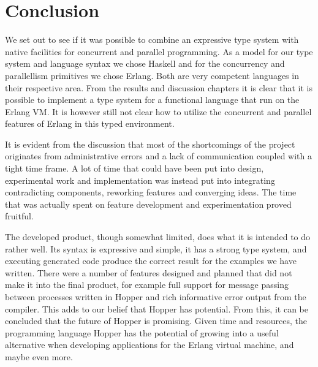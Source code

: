 \chapter{Conclusion}

We set out to see if it was possible to combine an expressive type system with native facilities for concurrent and parallel programming. As a model for our type system and language syntax we chose Haskell and for the concurrency and parallellism primitives we chose Erlang. Both are very competent languages in their respective area. From the results and discussion chapters it is clear that it is possible to implement a type system for a functional language that run on the Erlang VM. It is however still not clear how to utilize the concurrent and parallel features of Erlang in this typed environment.

It is evident from the discussion that most of the shortcomings of the project originates from administrative errors and a lack of communication coupled with a tight time frame. A lot of time that could have been put into design, experimental work and implementation was instead put into integrating contradicting components, reworking features and converging ideas. The time that was actually spent on feature development and experimentation proved fruitful. 

The developed product, though somewhat limited, does what it is intended to do rather well. Its syntax is expressive and simple, it has a strong type system, and executing generated code produce the correct result for the examples we have written. There were a number of features designed and planned that did not make it into the final product, for example full support for message passing between processes written in Hopper and rich informative error output from the compiler. This adds to our belief that Hopper has potential. From this, it can be concluded that the future of Hopper is promising. Given time and resources, the programming language Hopper has the potential of growing into a useful alternative when developing applications for the Erlang virtual machine, and maybe even more.
